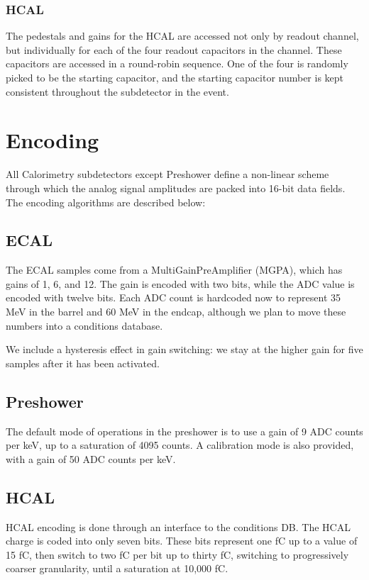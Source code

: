 \documentclass{cmspaper}
\begin{document}
\subsubsection{HCAL}

The pedestals and gains for the HCAL are accessed not only by readout channel, but individually for each of the four readout capacitors in the channel.  These capacitors are accessed in a round-robin sequence.  One of the four is randomly picked to be the starting capacitor, and the starting capacitor number is kept consistent throughout the subdetector in the event.

\section{Encoding}

All Calorimetry subdetectors except Preshower define a non-linear scheme through which
the analog signal amplitudes are packed into 16-bit data fields.  
The encoding algorithms are described below:

\subsection{ECAL}

The ECAL samples come from a MultiGainPreAmplifier (MGPA), which has gains of 1, 6, and 12.
The gain is encoded with two bits, while the ADC value is encoded with twelve bits.
Each ADC count is hardcoded now to represent 35 MeV in the barrel and 60 MeV in the endcap,
although we plan to move these numbers into a conditions database.

We include a hysteresis effect in gain switching: we stay at the higher
gain for five samples after it has been activated.

\subsection{Preshower}

The default mode of operations in the preshower is 
to use a gain of 9 ADC counts per keV, up to a saturation
of 4095 counts.  A calibration mode is also provided,
with a gain of 50 ADC counts per keV.

\subsection{HCAL}

HCAL encoding is done through an interface to the conditions DB.
The HCAL charge is coded into only seven bits.
These bits represent one fC up to a value of 15 fC,
then switch to two fC per bit up to thirty fC,
switching to progressively coarser granularity, until
a saturation at 10,000 fC.
\end{document}
